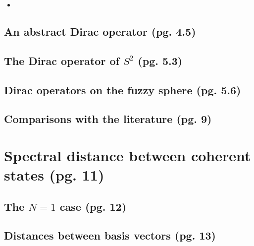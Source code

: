 \documentclass{article}
\begin{document}
    \begin{itemize}

    \item 
    
    \end{itemize}


\subsection{An abstract Dirac operator (pg. 4.5)}

\subsection{The Dirac operator of $S^2$ (pg. 5.3)}

\subsection{Dirac operators on the fuzzy sphere (pg. 5.6)}

\subsection{Comparisons with the literature (pg. 9)}

\section{Spectral distance between coherent states (pg. 11)}

\subsection{The $N = 1$ case (pg. 12)}

\subsection{Distances between basis vectors (pg. 13)}
\end{document}
